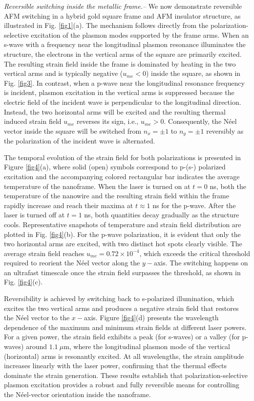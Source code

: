 \documentclass[aps,prl,reprint,floatfix,longbibliography,twocolumn]{revtex4-2}
\begin{document}
\textit{Reversible switching inside the metallic frame.--} We now demonstrate reversible AFM switching in a hybrid gold square frame and AFM insulator structure, as illustrated in Fig. \ref{fig1}(a). The mechanism follows directly from the polarization-selective excitation of the plasmon modes supported by the frame arms. When an s-wave with a frequency near the longitudinal plasmon resonance illuminates the structure, the electrons in the vertical arms of the square are primarily excited. The resulting strain field inside the frame is dominated by heating in the two vertical arms and is typically negative ($u_{me}<0$) inside the square, as shown in Fig. \ref{fig3}. In contrast, when a p-wave near the longitudinal resonance frequency is incident, plasmon excitation in the vertical arms is suppressed because the electric field of the incident wave is perpendicular to the longitudinal direction. Instead, the two horizontal arms will be excited and the resulting thermal induced strain field $u_{me}$ reverses its sign, i.e., $u_{me}>0$. Consequently, the Néel vector inside the square will be switched from $n_x=\pm 1$ to $n_y=\pm 1$ reversibly as the polarization of the incident wave is alternated.

The temporal evolution of the strain field for both polarizations is presented in Figure \ref{fig4}(a), where solid (open) symbols correspond to p-(s-) polarized excitation and the accompanying colored rectangular bar indicates the average temperature of the nanoframe. When the laser is turned on at $t=0$ ns, both the temperature of the nanowire and the resulting strain field within the frame rapidly increase and reach their maxima at $t\approx 1$ ns for the p-wave. After the laser is turned off at $t=1$ ns, both quantities decay gradually as the structure cools. Representative snapshots of temperature and strain field distribution are plotted in Fig. \ref{fig4}(b). For the p-wave polarization, it is evident that only the two horizontal arms are excited, with two distinct hot spots clearly visible. The average strain field reaches $u_{me}=0.72 \times 10^{-4}$, which exceeds the critical threshold required to reorient the Néel vector along the $y-$axis. The switching happens on an ultrafast timescale once the strain field surpasses the threshold, as shown in Fig. \ref{fig4}(c).

Reversibility is achieved by switching back to s-polarized illumination, which excites the two vertical arms and produces a negative strain field that restores the Néel vector to the $x-$axis. Figure \ref{fig4}(d) presents the wavelength dependence of the maximum and minimum strain fields at different laser powers. For a given power, the strain field exhibits a peak (for s-waves) or a valley (for p-waves) around $1.1~\mu \mathrm{m}$, where the longitudinal plasmon mode of the vertical (horizontal) arms is resonantly excited. At all wavelengths, the strain amplitude increases linearly with the laser power, confirming that the thermal effects dominate the strain generation. These results establish that polarization-selective plasmon excitation provides a robust and fully reversible means for controlling the Néel-vector orientation inside the nanoframe.
\end{document}
